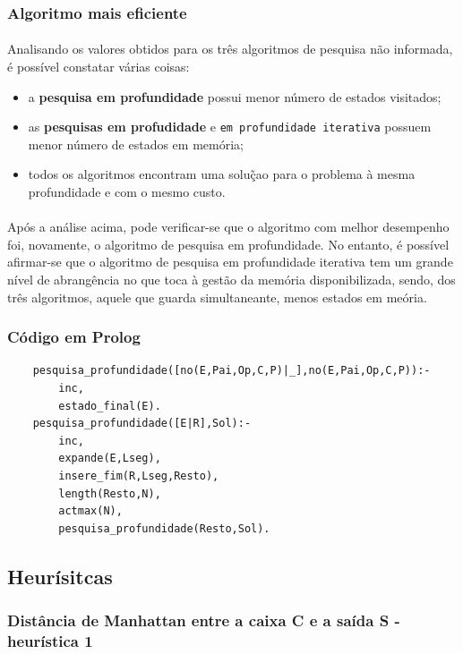 \documentclass{article}
\begin{document}
\subsubsection{Algoritmo mais eficiente}
\paragraph{} Analisando os valores obtidos para os três algoritmos de pesquisa não informada, é possível constatar várias coisas:
\begin{itemize}
  \item a \textbf{pesquisa em profundidade} possui menor número de estados visitados;
  \item as \textbf{pesquisas em profudidade} e \texttt{em profundidade iterativa} possuem menor número de estados em memória;
  \item todos os algoritmos encontram uma soluç̃ao para o problema à mesma profundidade e com o mesmo custo.
\end{itemize}

\paragraph{} Após a análise acima, pode verificar-se que o algoritmo com melhor desempenho foi, novamente, o algoritmo de pesquisa em profundidade. No entanto, é possível afirmar-se que o algoritmo de pesquisa em profundidade iterativa tem um grande nível de abrangência no que toca à gestão da memória disponibilizada, sendo, dos três algoritmos, aquele que guarda simultaneante, menos estados em meória.

\subsubsection{Código em Prolog}
\begin{verbatim}
    pesquisa_profundidade([no(E,Pai,Op,C,P)|_],no(E,Pai,Op,C,P)):-
        inc,
        estado_final(E).
    pesquisa_profundidade([E|R],Sol):-
        inc,
        expande(E,Lseg),
        insere_fim(R,Lseg,Resto),
        length(Resto,N),
        actmax(N),
        pesquisa_profundidade(Resto,Sol).
\end{verbatim}

\subsection{Heurísitcas}
\subsubsection{Distância de Manhattan entre a caixa C e a saída S - heurística 1}
\end{document}
